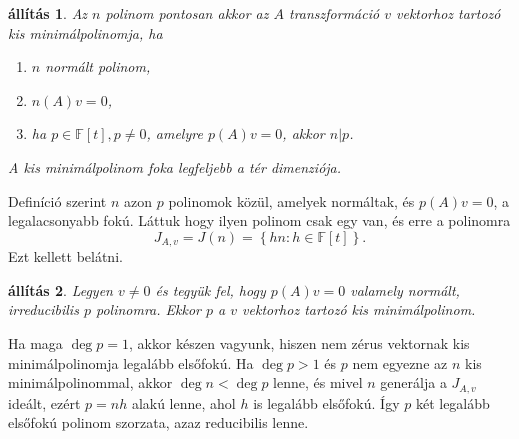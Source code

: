 \documentclass[9pt, a4paper, showtrims]{memoir}
\makeatletter
\renewenvironment{proof}[1][\proofname]
    {\par\pushQED{\qed}%
    \normalfont \topsep6\p@\@plus6\p@\relax
    \trivlist
    \item[\hskip\labelsep
        \itshape
    #1\@addpunct{:}]\ignorespaces}
    {\popQED\endtrivlist\@endpefalse}
\theoremstyle{plain}
\newtheorem{proposition}{állítás}[chapter]
\theoremstyle{remark}
\theoremstyle{definition}
\makeatother
\begin{document}
\begin{proposition}
	Az  $n$  polinom pontosan akkor az $A$ transzformáció $v$ vektorhoz tartozó kis minimálpolinomja, ha
	\begin{enumerate}
		\item $n$ normált polinom,
		\item $n\left( A \right)v=0$,
		\item ha $p\in\mathbb{F}\left[ t \right], p\neq 0$, amelyre
		      $p\left( A \right)v=0$, akkor $n|p$.
	\end{enumerate}
	A kis minimálpolinom foka legfeljebb a tér dimenziója.
\end{proposition}
\begin{proof}
	Definíció szerint $n$ azon $p$ polinomok közül,
	amelyek normáltak, és $p\left( A \right)v=0$, a legalacsonyabb fokú.
	Láttuk hogy ilyen polinom csak egy van, és erre a polinomra
	\[
		J_{A,v}=J\left( n \right)=\left\{ hn:h\in\mathbb{F}\left[ t \right] \right\}.
	\]
	Ezt kellett belátni.
\end{proof}
\begin{proposition}
	Legyen $v\neq 0$ és tegyük fel, hogy $p\left( A \right)v=0$ valamely normált,
	irreducibilis $p$ polinomra.
	Ekkor $p$ a $v$ vektorhoz tartozó kis minimálpolinom.
\end{proposition}
\begin{proof}
	Ha maga $\deg p=1$, akkor készen vagyunk, hiszen nem zérus vektornak kis minimálpolinomja legalább elsőfokú.
	Ha $\deg p>1$ és $p$ nem egyezne az $n$ kis minimálpolinommal,
	akkor $\deg n<\deg p$ lenne, és mivel $n$ generálja a $J_{A,v}$ ideált,
	ezért $p=nh$ alakú lenne, ahol $h$ is legalább elsőfokú.
	Így $p$ két legalább elsőfokú polinom szorzata, azaz reducibilis lenne.
\end{proof}
\end{document}
